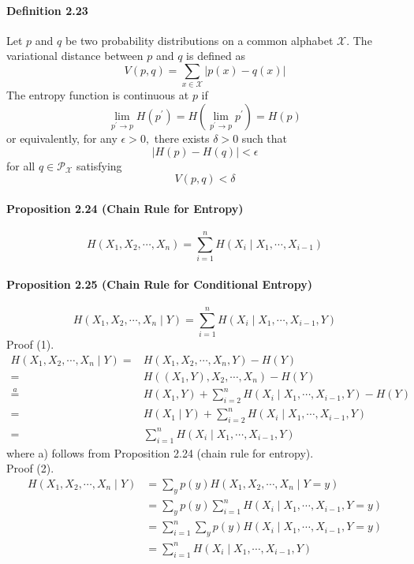 \documentclass[8pt]{article}
\begin{document}
\paragraph{Definition 2.23} Let $p$ and $q$ be two probability distributions on a common alphabet $\mathcal{X}$. The variational distance between $p$ and $q$ is defined as
$$
V(p, q)=\sum_{x \in \mathcal{X}}|p(x)-q(x)|
$$
The entropy function is continuous at $p$ if
$$
\lim _{p^{\prime} \rightarrow p} H\left(p^{\prime}\right)=H\left(\lim _{p^{\prime} \rightarrow p} p^{\prime}\right)=H(p)
$$
or equivalently, for any $\epsilon>0,$ there exists $\delta>0$ such that
$$
|H(p)-H(q)|<\epsilon
$$
for all $q \in \mathcal{P}_{\mathcal{X}}$ satisfying
$$
V(p, q)<\delta
$$

\paragraph{Proposition 2.24 (Chain Rule for Entropy)}
$$
H\left(X_{1}, X_{2}, \cdots, X_{n}\right)=\sum_{i=1}^{n} H\left(X_{i} \mid X_{1}, \cdots, X_{i-1}\right)
$$
\paragraph{Proposition 2.25 (Chain Rule for Conditional Entropy)}
$$
H\left(X_{1}, X_{2}, \cdots, X_{n} \mid Y\right)=\sum_{i=1}^{n} H\left(X_{i} \mid X_{1}, \cdots, X_{i-1}, Y\right)
$$
Proof (1).
$$
\begin{aligned}
H\left(X_{1}, X_{2}, \cdots, X_{n} \mid Y\right)
=& H\left(X_{1}, X_{2}, \cdots, X_{n}, Y\right)-H(Y) \\
=& H\left(\left(X_{1}, Y\right), X_{2}, \cdots, X_{n}\right)-H(Y) \\
\stackrel{a}{=} & H\left(X_{1}, Y\right)+\sum_{i=2}^{n} H\left(X_{i} \mid X_{1}, \cdots, X_{i-1}, Y\right)-H(Y) \\
=&H\left(X_{1} \mid Y\right)+\sum_{i=2}^{n} H\left(X_{i} \mid X_{1}, \cdots, X_{i-1}, Y\right) \\
=&\sum_{i=1}^{n} H\left(X_{i} \mid X_{1}, \cdots, X_{i-1}, Y\right)
\end{aligned}
$$
where a) follows from Proposition 2.24 (chain rule for entropy). \\

Proof (2).
$$
\begin{aligned}
H \left(X_{1}, X_{2}, \cdots, X_{n} \mid Y\right)
&=\sum_{y} p(y) H\left(X_{1}, X_{2}, \cdots, X_{n} \mid Y=y\right) \\
&=\sum_{y} p(y) \sum_{i=1}^{n} H\left(X_{i} \mid X_{1}, \cdots, X_{i-1}, Y=y\right) \\
&=\sum_{i=1}^{n} \sum_{y} p(y) H\left(X_{i} \mid X_{1}, \cdots, X_{i-1}, Y=y\right) \\
&=\sum_{i=1}^{n} H\left(X_{i} \mid X_{1}, \cdots, X_{i-1}, Y\right)
\end{aligned}
$$
\end{document}
